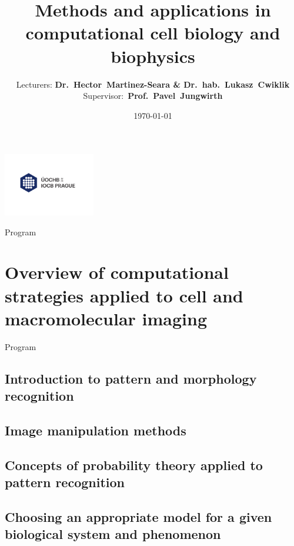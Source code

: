 \documentclass[10pt]{beamer}              %
\title[Methods computational Biology]{{\huge Methods and applications in computational cell biology and biophysics}} %
\author[H.Martinez-Seara \& L. Cwiklik]{Lecturers: \textbf{Dr.~Hector~Martinez-Seara \& Dr.~hab.~Lukasz~Cwiklik} Supervisor:~\textbf{Prof.~Pavel~Jungwirth}} %
\institute[] %
{
Charles University - Faculty XXX, Prague, Czech Republic \\ %
\medskip
\textit{hseara@uochb.cas.cz, lukasz.cwiklik@jh-inst.cas.cz} %
}
\date{\today}
\begin{document}
\begin{frame}
  \titlepage %
  \begin{center}
    \vspace{-1cm}
    \includegraphics[width=0.3\textwidth]{logos/UOCHB_IOCB-logo.pdf}
  \end{center}
\end{frame}

\begin{frame}{Program} 
\tableofcontents [hideallsubsections]
\end{frame}

\section{Overview of computational strategies applied to cell and macromolecular imaging}
\begin{frame}{Program} 
\tableofcontents [sectionstyle=show/shaded,subsectionstyle=show/show/hide] 
\end{frame}

\subsection{Introduction to pattern and morphology recognition}

\subsection{Image manipulation methods}

\subsection{Concepts of probability theory applied to pattern recognition}

\subsection{Choosing an appropriate model for a given biological system and phenomenon}
\end{document}
